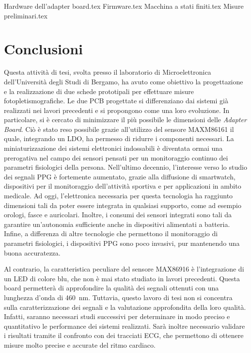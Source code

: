 \documentclass[
	a4paper,
	cleardoublepage=empty,
	headings=twolinechapter,
	numbers=autoenddot,
]{scrbook}
\begin{document}
	{Hardware dell’adapter board.tex}
	{Firmware.tex}
	{Macchina a stati finiti.tex}
	{Misure preliminari.tex}
	
	\chapter*{Conclusioni}
	Questa attività di tesi, svolta presso il laboratorio di Microelettronica dell'Università degli Studi di Bergamo, ha avuto come obiettivo la progettazione e la realizzazione di due schede prototipali per effettuare misure fotopletismografiche. Le due PCB progettate si differenziano dai sistemi già realizzati nei lavori precedenti e si propongono come una loro evoluzione. In particolare, si è cercato di minimizzare il più possibile le dimensioni delle \textit{Adapter Board}. Ciò è stato reso possibile grazie all'utilizzo del sensore MAXM86161 il quale, integrando un LDO, ha permesso di ridurre i componenti necessari. La miniaturizzazione dei sistemi elettronici indossabili è diventata ormai una prerogativa nel campo dei sensori pensati per un monitoraggio continuo dei parametri fisiologici della persona. Nell'ultimo decennio, l'interesse verso lo studio dei segnali PPG è fortemente aumentato, grazie alla diffusione di smartwatch, dispositivi per il monitoraggio dell'attività sportiva e per applicazioni in ambito medicale. Ad oggi, l'elettronica necessaria per questa tecnologia ha raggiunto dimensioni tali da poter essere integrata in qualsiasi supporto, come ad esempio orologi, fasce e auricolari. Inoltre, i consumi dei sensori integrati sono tali da garantire un'autonomia sufficiente anche in dispositivi alimentati a batteria. Infine, a differenza di altre tecnologie che permettono il monitoraggio di parametri fisiologici, i dispositivi PPG sono poco invasivi, pur mantenendo una buona accuratezza.
	
	Al contrario, la caratteristica peculiare del sensore MAX86916 è l'integrazione di un LED di colore blu, che non è mai stato studiato in lavori precedenti. Questa board permetterà di approfondire la qualità dei segnali ottenuti con una lunghezza d'onda di \SI{460}{\nano\meter}. Tuttavia, questo lavoro di tesi non si concentra sulla caratterizzazione dei segnali e la valutazione approfondita della loro qualità. Infatti, saranno necessari studi successivi per determinare in modo preciso e quantitativo le performance dei sistemi realizzati. Sarà inoltre necessario validare i risultati tramite il confronto con dei tracciati ECG, che permettono di ottenere misure molto precise e accurate del ritmo cardiaco.
	
\end{document}

